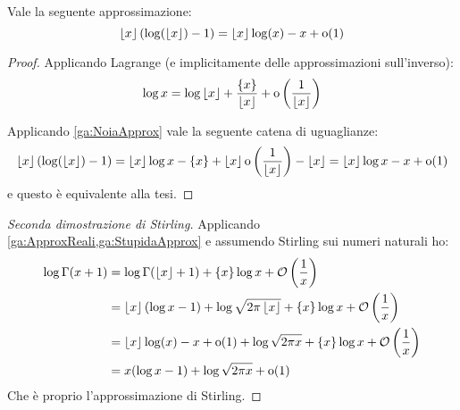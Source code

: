 \begin{lemma}\label{ga:StupidaApprox}
	Vale la seguente approssimazione:
	\begin{equation*}
		\left\lfloor x \right\rfloor(\log(\left\lfloor x \right\rfloor)-1)=\left\lfloor x \right\rfloor \log(x)-x+\mathrm{o}(1)
	\end{equation*}
\end{lemma}
\begin{proof}
	Applicando Lagrange (e implicitamente delle approssimazioni sull'inverso):
	\begin{equation}\label{ga:NoiaApprox}
		\log{x}=\log{\ensuremath{\left\lfloor x \right\rfloor}} + \frac{\{x\}}{\left\lfloor x \right\rfloor} +\mathrm{o}\left(\frac 1{\left\lfloor x \right\rfloor}\right)
	\end{equation}
	
	Applicando \cref{ga:NoiaApprox} vale la seguente catena di uguaglianze:
	\begin{equation*}
		\left\lfloor x \right\rfloor(\log(\left\lfloor x \right\rfloor)-1)=\left\lfloor x \right\rfloor\log{x}-\{x\}+
		\left\lfloor x \right\rfloor\mathrm{o}\left(\frac 1{\left\lfloor x \right\rfloor}\right)-\left\lfloor x \right\rfloor=
		\left\lfloor x \right\rfloor\log{x}-x+\mathrm{o}(1)
	\end{equation*}
	e questo è equivalente alla tesi.
\end{proof}



\begin{proof}[Seconda dimostrazione di Stirling]
	Applicando \cref{ga:ApproxReali,ga:StupidaApprox} e assumendo Stirling sui numeri naturali ho:
	\begin{equation*}\begin{split}
		\log{\Gamma(x+1)}&=\log\Gamma(\left\lfloor x \right\rfloor+1)+\{x\}\log{x}+\mathcal{O}\left(\frac 1x\right)\\
		&=\left\lfloor x \right\rfloor\left(\log{x}-1\right)+\log{\sqrt{2\pi\ensuremath{\left\lfloor x \right\rfloor}}}+\{x\}\log{x}+\mathcal{O}\left(\frac 1x\right)\\
		&=\left\lfloor x \right\rfloor \log(x)-x+\mathrm{o}(1)+\log{\sqrt{2\pi x}}+\{x\}\log{x}+\mathcal{O}\left(\frac 1x\right)\\
		&=x(\log{x}-1)+\log{\sqrt{2\pi x}}+\mathrm{o}(1)
	\end{split}\end{equation*}
	Che è proprio l'approssimazione di Stirling.
\end{proof}






